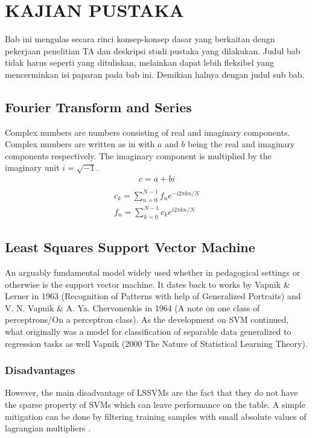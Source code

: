 \chapter{KAJIAN PUSTAKA}

\noindent Bab ini mengulas secara rinci konsep-konsep dasar yang berkaitan dengn pekerjaan penelitian TA dan deskripsi studi pustaka yang dilakukan. Judul bab tidak harus seperti yang dituliskan, melainkan dapat lebih fleksibel yang mencerminkan isi paparan pada bab ini. Demikian halnya dengan judul sub bab.

\section{Fourier Transform and Series}\label{sec:fourier_discussion}
\noindent

Complex numbers are numbers consisting of real and imaginary components. Complex numbers are written as in  with \(a \) and \(b \) being the real and imaginary components respectively. The imaginary component is multiplied by the imaginary unit \(i=\sqrt{-1}\).
\begin{align}
  c = a + bi \label{eq:complex_number} \\
\end{align}
\autocite{DiscreteFourierTransform}
\begin{align}
  c_k=\sum_{n=0}^{N-1} f_n e^{-i2\pi kn/N} \label{eq:discrete_fourier_transform}\\
  f_n=\sum_{k=0}^{N-1} c_k e^{i2\pi kn/N} \label{eq:inverse_discrete_fourier_transform}
\end{align}

\section{Least Squares Support Vector Machine}
\noindent An arguably fundamental model widely used whether in pedagogical settings or otherwise is the support vector machine. It dates back to works by Vapnik \& Lerner in 1963 (Recognition of Patterns with help of Generalized Portraits) and V. N. Vapnik \& A. Ya. Chervonenkis in 1964 (A note on one class of perceptrons/On a perceptron class). As the development on SVM continued, what originally was a model for classification of separable data generalized to regression tasks as well Vapnik (2000 The Nature of Statistical Learning Theory).
\subsection{Disadvantages}
However, the main disadvantage of LSSVMs are the fact that they do not have the sparse property of SVMs which can leave performance on the table. A simple mitigation can be done by filtering training samples with small absolute values of lagrangian multipliers \autocite{haifengwangComparisonSVMLSSVM2005}.


